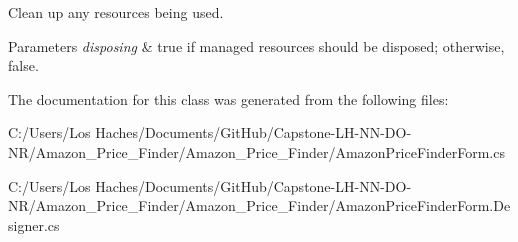 Clean up any resources being used. 


\begin{DoxyParams}{Parameters}
{\em disposing} & true if managed resources should be disposed; otherwise, false.\\
\hline
\end{DoxyParams}


The documentation for this class was generated from the following files\-:\begin{DoxyCompactItemize}
\item 
C\-:/\-Users/\-Los Haches/\-Documents/\-Git\-Hub/\-Capstone-\/\-L\-H-\/\-N\-N-\/\-D\-O-\/\-N\-R/\-Amazon\-\_\-\-Price\-\_\-\-Finder/\-Amazon\-\_\-\-Price\-\_\-\-Finder/Amazon\-Price\-Finder\-Form.\-cs\item 
C\-:/\-Users/\-Los Haches/\-Documents/\-Git\-Hub/\-Capstone-\/\-L\-H-\/\-N\-N-\/\-D\-O-\/\-N\-R/\-Amazon\-\_\-\-Price\-\_\-\-Finder/\-Amazon\-\_\-\-Price\-\_\-\-Finder/Amazon\-Price\-Finder\-Form.\-Designer.\-cs\end{DoxyCompactItemize}
